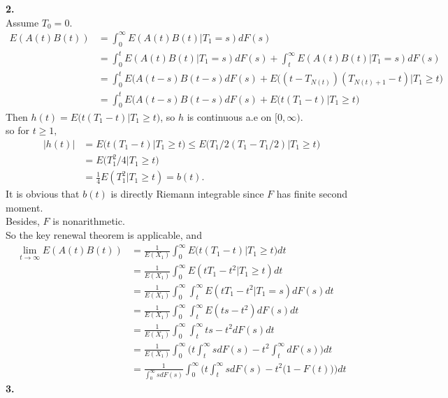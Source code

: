 \documentclass{amsart}
\theoremstyle{plain}
\theoremstyle{definition}
\begin{document}
 \noindent \textbf{2.}\\
Assume $T_0 = 0$.
\begin{align*}
	E(A(t)B(t)) &= \int_{0}^{\infty}E(A(t)B(t)|T_1 = s)dF(s) \\
			    	  	 &= \int_{0}^{t}E(A(t)B(t)|T_1 = s)dF(s) + \int_{t}^{\infty}E(A(t)B(t)|T_1 = s)dF(s) \\
			   		 	&= \int_{0}^{t} E(A(t-s)B(t-s)dF(s) + E\Big((t-T_{N(t)})(T_{N(t)+1} - t) | T_1 \geq t\Big)\\
			  	 	  &= \int_{0}^{t} E(A(t-s)B(t-s)dF(s) + E\big(t(T_1 - t)| T_1 \geq t\Big) 
\end{align*}
Then $h(t) = E\big(t(T_1 - t) | T_1 \geq t \big) $, so $h$ is continuous a.e on $[0,\infty)$.\\
	so for $t \geq 1,$
	\begin{align*}
		|h(t)|  &= E\big(t(T_1 - t)|T_1 \geq t) \leq E\big(T_1/2(T_1 - T_1/2)|T_1 \geq t\big) \\
				&= E\big(T_1^2/4\big|T_1 \geq t) \\
				&= \frac{1}{4}E(T_1^2|T_1 \geq  t) = b(t). 
	\end{align*}
	It is obvious that $b(t)$ is directly Riemann integrable since $F$ has finite second moment.\\
	Besides, $F$ is nonarithmetic.\\
	So the key renewal theorem is applicable, and 
	\begin{align*}	
		\lim_{t\to \infty} E(A(t)B(t)) &= \frac{1}{E(X_1)}\int_0^{\infty}E\big(t(T_1 - t)| T_1 \geq t\Big)dt \\
									   &= \frac{1}{E(X_1)} \int_0^{\infty} E(tT_1-t^2 | T_1 \geq t )dt \\
				  			 		   &= \frac{1}{E(X_1)} \int_0^{\infty} \int_{t}^{\infty} E(tT_1-t^2 | T_1= s) dF(s)dt \\
						 		   	   &= \frac{1}{E(X_1)} \int_0^{\infty} \int_{t}^{\infty} E(ts-t^2) dF(s)dt\\
									   &= \frac{1}{E(X_1)} \int_0^{\infty} \int_{t}^{\infty} ts-t^2 dF(s)dt \\
									   &= \frac{1}{E(X_1)} \int_0^{\infty} \Bigg(t\int_{t}^{\infty}sdF(s)-t^2\int_{t}^{\infty} dF(s)\Bigg)dt \\
									   &= \frac{1}{\int_{0}^{\infty}sdF(s)} \int_0^{\infty} \Bigg(t\int_{t}^{\infty}sdF(s)-t^2\big(1-F(t)\big)\Bigg)dt
	\end{align*}
\noindent \textbf{3.}
\end{document}
